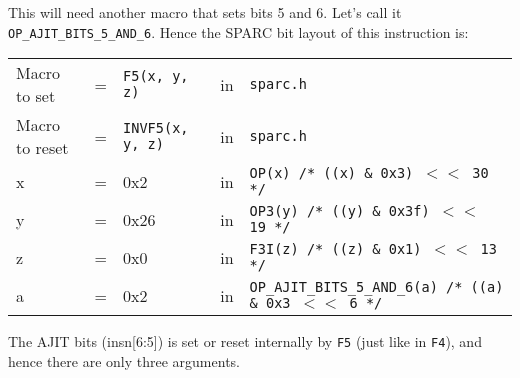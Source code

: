 \begin{enumerate}
\begin{enumerate}
    This will need another macro that sets bits 5 and 6. Let's call it
    \texttt{OP\_AJIT\_BITS\_5\_AND\_6}.   Hence the  SPARC bit  layout of  this
    instruction is:

    \begin{tabular}[h]{lclcl}
      Macro to set  &=& \texttt{F5(x, y, z)} &in& \texttt{sparc.h}     \\
      Macro to reset  &=& \texttt{INVF5(x, y, z)} &in& \texttt{sparc.h}     \\
      x &=& 0x2      &in& \texttt{OP(x)  /* ((x) \& 0x3)  $<<$ 30 */} \\
      y &=& 0x26     &in& \texttt{OP3(y) /* ((y) \& 0x3f) $<<$ 19 */} \\
      z &=& 0x0      &in& \texttt{F3I(z) /* ((z) \& 0x1)  $<<$ 13 */} \\
      a &=& 0x2      &in& \texttt{OP\_AJIT\_BITS\_5\_AND\_6(a) /* ((a) \& 0x3  $<<$ 6 */}
    \end{tabular}

    The AJIT bits (insn[6:5]) is  set or reset internally by \texttt{F5}
    (just  like  in  \texttt{F4}),  and   hence  there  are  only  three
    arguments.


\end{enumerate}
\end{enumerate}
